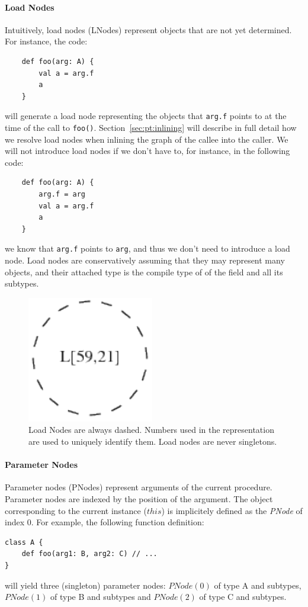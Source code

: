 \paragraph{Load Nodes}
Intuitively, load nodes (LNodes) represent objects that are not yet determined.
For instance, the code:
\begin{lstlisting}
    def foo(arg: A) {
        val a = arg.f
        a
    }
\end{lstlisting}
will generate a load node representing the objects that \verb/arg.f/ points to
at the time of the call to \verb/foo()/. Section~\ref{sec:pt:inlining} will
describe in full detail how we resolve load nodes when inlining the graph of
the callee into the caller. We will not introduce load nodes if we don't have
to, for instance, in the following code:
\begin{lstlisting}
    def foo(arg: A) {
        arg.f = arg
        val a = arg.f
        a
    }
\end{lstlisting}
we know that \verb/arg.f/ points to \verb/arg/, and thus we don't need to
introduce a load node. Load nodes are conservatively assuming that they may
represent many objects, and their attached type is the compile type of of the
field and all its subtypes.

\begin{figure}[h]
    \centering

    \includegraphics{images/pt_lnodes}

    \caption{Load Nodes are always dashed. Numbers used in the representation
    are used to uniquely identify them. Load nodes are never singletons.}
    \label{fig:pt:lnodes}
\end{figure}

\paragraph{Parameter Nodes} Parameter nodes (PNodes) represent arguments of the current
procedure. Parameter nodes are indexed by the position of the argument. The object
corresponding to the current instance ($this$) is implicitely defined as the
\emph{PNode} of index 0. For example, the following function definition:
\begin{lstlisting}
class A {
    def foo(arg1: B, arg2: C) // ...
}
\end{lstlisting}
will yield three (singleton) parameter nodes: $PNode(0)$ of type A and
subtypes, $PNode(1)$ of type B and subtypes and $PNode(2)$ of type C and
subtypes.

